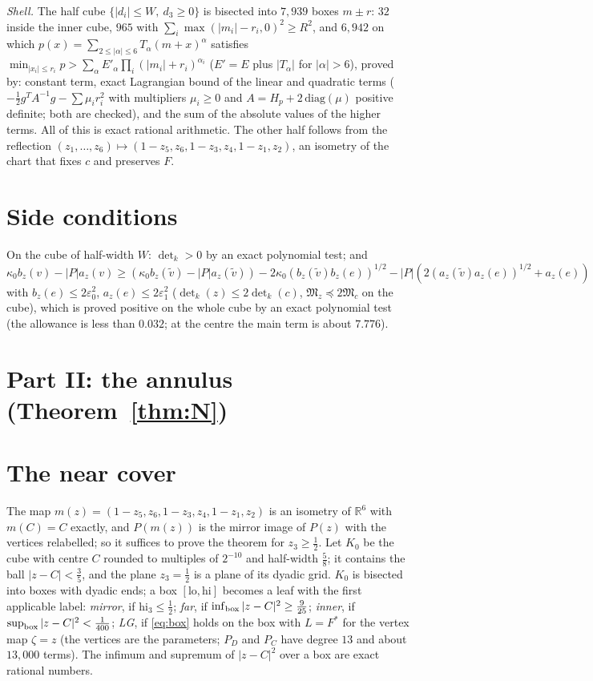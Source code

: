 \documentclass[11pt]{article}
\theoremstyle{remark}
\newcommand{\R}{\mathbb{R}}
\newcommand{\M}{\mathfrak{M}}
\begin{document}
\emph{Shell.} The half cube $\{|d_i|\le W,\ d_3\ge0\}$ is bisected into $7{,}939$ boxes $m\pm r$: $32$ inside the
inner cube, $965$ with $\sum_i\max(|m_i|-r_i,0)^2\ge R^2$, and $6{,}942$ on which
$p(x)=\sum_{2\le|\alpha|\le6}T_\alpha(m+x)^\alpha$ satisfies $\min_{|x_i|\le r_i}p>\sum_\alpha E'_\alpha\prod_i
(|m_i|+r_i)^{\alpha_i}$ ($E'=E$ plus $|T_\alpha|$ for $|\alpha|>6$), proved by: constant term, exact Lagrangian bound of
the linear and quadratic terms ($-\frac12g^TA^{-1}g-\sum\mu_ir_i^2$ with multipliers $\mu_i\ge0$ and $A=H_p+2\,\mathrm{diag}(\mu)$ positive
definite; both are checked),
and the sum of the absolute values of the higher terms. All of this is exact rational arithmetic. The other half
follows from the reflection $(z_1,\dots,z_6)\mapsto(1-z_5,z_6,1-z_3,z_4,1-z_1,z_2)$, an isometry of the chart that fixes
$c$ and preserves $F$.

\section{Side conditions}\label{sec:side}
On the cube of half-width $W$: $\det_k>0$ by an exact polynomial test; and
$\kappa_0b_z(v)-|P|a_z(v)\ge(\kappa_0b_z(\tilde v)-|P|a_z(\tilde v))-2\kappa_0(b_z(\tilde v)b_z(e))^{1/2}-
|P|(2(a_z(\tilde v)a_z(e))^{1/2}+a_z(e))$ with $b_z(e)\le2\varepsilon_0^2$, $a_z(e)\le2\varepsilon_1^2$
($\det_k(z)\le2\det_k(c)$, $\M_z\preceq2\M_c$ on the cube), which is proved positive on the whole cube by an exact polynomial test (the allowance is less than $0.032$; at the
centre the main term is about $7.776$).

\section*{Part II: the annulus (Theorem~\ref{thm:N})}
\section{The near cover}\label{sec:near}
The map $m(z)=(1-z_5,z_6,1-z_3,z_4,1-z_1,z_2)$ is an isometry of $\R^6$ with $m(C)=C$ exactly, and $P(m(z))$ is the
mirror image of $P(z)$ with the vertices relabelled; so it suffices to prove the theorem for $z_3\ge\frac12$. Let $K_0$
be the cube with centre $C$ rounded to multiples of $2^{-10}$ and half-width $\frac58$; it contains the ball
$|z-C|<\frac35$, and the plane $z_3=\frac12$ is a plane of its dyadic grid. $K_0$ is bisected into boxes with dyadic
ends; a box $[\mathrm{lo},\mathrm{hi}]$ becomes a leaf with the first applicable label:
\emph{mirror}, if $\mathrm{hi}_3\le\frac12$; \emph{far}, if $\inf_{\rm box}|z-C|^2\ge\frac9{25}$; \emph{inner}, if
$\sup_{\rm box}|z-C|^2<\frac1{400}$; \emph{LG}, if \eqref{eq:box} holds on the box with $L=F^*$ for the vertex map
$\zeta=z$ (the vertices are the parameters; $P_D$ and $P_C$ have degree $13$ and about $13{,}000$ terms). The infimum
and supremum of $|z-C|^2$ over a box are exact rational numbers.
\end{document}
